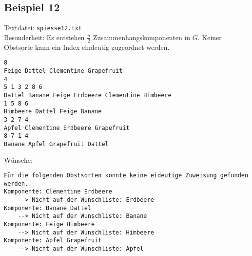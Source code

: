 \newpage
\subsection{Beispiel 12}\label{example:12}
Textdatei: \texttt{spiesse12.txt}\\
Besonderheit: Es entstehen $\frac{n}{2}$ Zusammenhangskomponenten in $G$. Keiner Obstsorte kann ein Index eindeutig zugeordnet werden.
\begin{verbatim}
8
Feige Dattel Clementine Grapefruit
4
5 1 3 2 8 6
Dattel Banane Feige Erdbeere Clementine Himbeere
1 5 8 6
Himbeere Dattel Feige Banane
3 2 7 4
Apfel Clementine Erdbeere Grapefruit
8 7 1 4
Banane Apfel Grapefruit Dattel
\end{verbatim}

\noindent
Wünsche: 
\vspace{0.25cm}

\noindent
{}
\begin{verbatim}
Für die folgenden Obstsorten konnte keine eideutige Zuweisung gefunden werden.
Komponente: Clementine Erdbeere 
	--> Nicht auf der Wunschliste: Erdbeere 
Komponente: Banane Dattel 
	--> Nicht auf der Wunschliste: Banane 
Komponente: Feige Himbeere 
	--> Nicht auf der Wunschliste: Himbeere 
Komponente: Apfel Grapefruit 
	--> Nicht auf der Wunschliste: Apfel
\end{verbatim}
